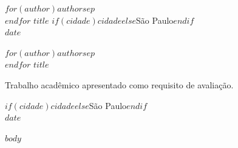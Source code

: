 \documentclass[
  12pt,
  a4paper,
  oneside,
  chapter=TITLE,
  section=TITLE,
  brazil
]{abntex2}
\begin{document}
\pretextual

\begin{capa}
\centering
{\ABNTEXchapterfont\large
$for(author)$$author$$sep$ \\ $endfor$
}
\vfill
{\ABNTEXchapterfont\bfseries\Large\MakeUppercase{$title$}}
\vfill
{\large $if(cidade)$$cidade$$else$São Paulo$endif$ \\ $date$}
\end{capa}

\begin{folhaderosto}
\centering
{\ABNTEXchapterfont\large
$for(author)$$author$$sep$ \\ $endfor$
}
\vfill
{\ABNTEXchapterfont\bfseries\Large\MakeUppercase{$title$}}
\vfill
\hfill
\begin{minipage}{8cm}
\small
Trabalho acadêmico apresentado como requisito de avaliação.
\end{minipage}
\vfill
{\large $if(cidade)$$cidade$$else$São Paulo$endif$ \\ $date$}
\end{folhaderosto}

\tableofcontents*
\cleardoublepage


\textual
\setcounter{page}{1}
\pagestyle{fancy}

$body$

\postextual

\renewcommand{\bibname}{REFERÊNCIAS}

\printbibliography
\end{document}
